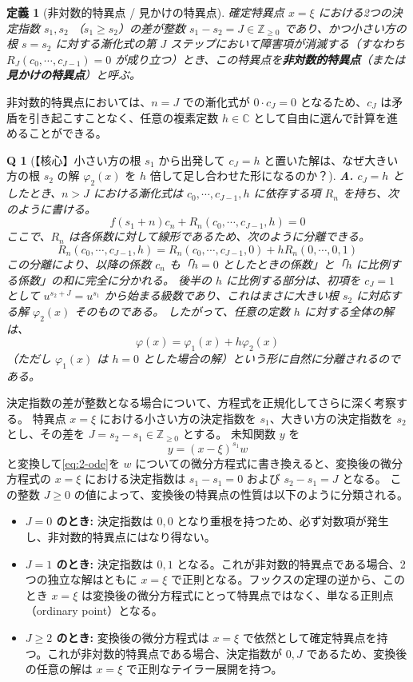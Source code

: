 \documentclass[paper=a4, fontsize=11pt]{jlreq} %
\theoremstyle{break}
\newtheorem{definition}[theorem]{定義}
\theoremstyle{qa}
\newtheorem*{Q}{Q}
\theoremstyle{remark} %
\begin{document}
\begin{definition}[非対数的特異点 / 見かけの特異点]\label{def:non_logarithmic}
確定特異点 $x=\xi$ における2つの決定指数 $s_{1}, s_{2}$ （$s_{1} \ge s_{2}$）の差が整数 $s_{1} - s_{2} = J \in \mathbb{Z}_{\ge 0}$ であり、かつ小さい方の根 $s=s_{2}$ に対する漸化式の第 $J$ ステップにおいて障害項が消滅する（すなわち $R_{J}(c_{0}, \cdots, c_{J-1}) = 0$ が成り立つ）とき、この特異点を\textbf{非対数的特異点}（または\textbf{見かけの特異点}）と呼ぶ。
\end{definition}

非対数的特異点においては、$n=J$ での漸化式が $0 \cdot c_{J} = 0$ となるため、$c_{J}$ は矛盾を引き起こすことなく、任意の複素定数 $h \in \mathbb{C}$ として自由に選んで計算を進めることができる。

\begin{Q}[【核心】小さい方の根 $s_1$ から出発して $c_J = h$ と置いた解は、なぜ大きい方の根 $s_2$ の解 $\varphi_{2}(x)$ を $h$ 倍して足し合わせた形になるのか？]
\textbf{A.} $c_J = h$ としたとき、$n > J$ における漸化式は $c_0, \cdots, c_{J-1}, h$ に依存する項 $R_n$ を持ち、次のように書ける。
\[
f(s_1+n)c_n + R_n(c_0, \cdots, c_{J-1}, h) = 0
\]
ここで、$R_n$ は各係数に対して線形であるため、次のように分離できる。
\[
R_n(c_0, \cdots, c_{J-1}, h) = R_n(c_0, \cdots, c_{J-1}, 0) + h R_n(0, \cdots, 0, 1)
\]
この分離により、以降の係数 $c_n$ も「$h=0$ としたときの係数」と「$h$ に比例する係数」の和に完全に分かれる。
後半の $h$ に比例する部分は、初項を $c_J=1$ として $u^{s_2+J} = u^{s_1}$ から始まる級数であり、これはまさに大きい根 $s_2$ に対応する解 $\varphi_{2}(x)$ そのものである。
したがって、任意の定数 $h$ に対する全体の解は、
\[
\varphi(x) = \varphi_{1}(x) + h\varphi_{2}(x)
\]
（ただし $\varphi_{1}(x)$ は $h=0$ とした場合の解）という形に自然に分離されるのである。
\end{Q}
決定指数の差が整数となる場合について、方程式を正規化してさらに深く考察する。
特異点 $x=\xi$ における小さい方の決定指数を $s_{1}$、大きい方の決定指数を $s_{2}$ とし、その差を $J = s_{2} - s_{1} \in \mathbb{Z}_{\ge 0}$ とする。
未知関数 $y$ を
\[
y = (x-\xi)^{s_{1}} w
\]
と変換して\eqref{eq:2-ode}を $w$ についての微分方程式に書き換えると、変換後の微分方程式の $x=\xi$ における決定指数は $s_{1}-s_{1}=0$ および $s_{2}-s_{1}=J$ となる。
この整数 $J \ge 0$ の値によって、変換後の特異点の性質は以下のように分類される。

\begin{itemize}
    \item \textbf{$J=0$ のとき:} 決定指数は $0, 0$ となり重根を持つため、必ず対数項が発生し、非対数的特異点にはなり得ない。
    \item \textbf{$J=1$ のとき:} 決定指数は $0, 1$ となる。これが非対数的特異点である場合、2つの独立な解はともに $x=\xi$ で正則となる。フックスの定理の逆から、このとき $x=\xi$ は変換後の微分方程式にとって特異点ではなく、単なる正則点（ordinary point）となる。
    \item \textbf{$J \ge 2$ のとき:} 変換後の微分方程式は $x=\xi$ で依然として確定特異点を持つ。これが非対数的特異点である場合、決定指数が $0, J$ であるため、変換後の任意の解は $x=\xi$ で正則なテイラー展開を持つ。
\end{itemize}
\end{document}
